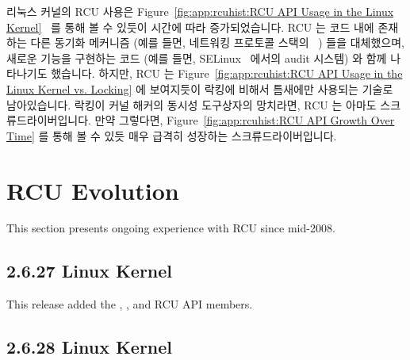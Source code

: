 리눅스 커널의 RCU 사용은
Figure~\ref{fig:app:rcuhist:RCU API Usage in the Linux Kernel}~\cite{PaulEMcKenneyRCUusagePage}
를 통해 볼 수 있듯이 시간에 따라 증가되었습니다.
RCU 는 코드 내에 존재하는 다른 동기화 메커니즘 (예를 들면, 네트워킹 프로토콜
스택의 ~\cite{Molnar00a,Torvalds2.5.69,Torvalds2.5.70}) 들을
대체했으며, 새로운 기능을 구현하는 코드 (예를 들면,
SELinux~\cite{JamesMorris04b} 에서의 audit 시스템) 와 함께 나타나기도 했습니다.
하지만, RCU 는
Figure~\ref{fig:app:rcuhist:RCU API Usage in the Linux Kernel vs. Locking} 에
보여지듯이 락킹에 비해서 틈새에만 사용되는 기술로 남아있습니다.
락킹이 커널 해커의 동시성 도구상자의 망치라면, RCU 는 아마도
스크류드라이버입니다.
만약 그렇다면,
Figure~\ref{fig:app:rcuhist:RCU API Growth Over Time} 를 통해 볼 수 있듯 매우
급격히 성장하는 스크류드라이버입니다.

\section{RCU Evolution}
\label{sec:app:rcuhist:RCU Evolution}

This section presents ongoing experience with RCU since mid-2008.

\subsection{2.6.27 Linux Kernel}

This release added the
,
, and
 RCU API members.

\subsection{2.6.28 Linux Kernel}

